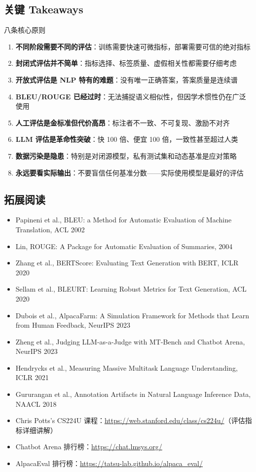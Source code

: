 \documentclass[a4paper]{article}
\begin{document}
\subsection{关键 Takeaways}

\begin{importantbox}{八条核心原则}
\begin{enumerate}
    \item \textbf{不同阶段需要不同的评估}：训练需要快速可微指标，部署需要可信的绝对指标
    \item \textbf{封闭式评估并不简单}：指标选择、标签质量、虚假相关性都需要仔细考虑
    \item \textbf{开放式评估是 NLP 特有的难题}：没有唯一正确答案，答案质量是连续谱
    \item \textbf{BLEU/ROUGE 已经过时}：无法捕捉语义相似性，但因学术惯性仍在广泛使用
    \item \textbf{人工评估是金标准但代价高昂}：标注者不一致、不可复现、激励不对齐
    \item \textbf{LLM 评估是革命性突破}：快 100 倍、便宜 100 倍，一致性甚至超过人类
    \item \textbf{数据污染是隐患}：特别是对闭源模型，私有测试集和动态基准是应对策略
    \item \textbf{永远要看实际输出}：不要盲信任何基准分数——实际使用模型是最好的评估
\end{enumerate}
\end{importantbox}

\subsection{拓展阅读}

\begin{itemize}
    \item Papineni et al., BLEU: a Method for Automatic Evaluation of Machine Translation, ACL 2002
    \item Lin, ROUGE: A Package for Automatic Evaluation of Summaries, 2004
    \item Zhang et al., BERTScore: Evaluating Text Generation with BERT, ICLR 2020
    \item Sellam et al., BLEURT: Learning Robust Metrics for Text Generation, ACL 2020
    \item Dubois et al., AlpacaFarm: A Simulation Framework for Methods that Learn from Human Feedback, NeurIPS 2023
    \item Zheng et al., Judging LLM-as-a-Judge with MT-Bench and Chatbot Arena, NeurIPS 2023
    \item Hendrycks et al., Measuring Massive Multitask Language Understanding, ICLR 2021
    \item Gururangan et al., Annotation Artifacts in Natural Language Inference Data, NAACL 2018
    \item Chris Potts's CS224U 课程：\url{https://web.stanford.edu/class/cs224u/}（评估指标详细讲解）
    \item Chatbot Arena 排行榜：\url{https://chat.lmsys.org/}
    \item AlpacaEval 排行榜：\url{https://tatsu-lab.github.io/alpaca_eval/}
\end{itemize}
\end{document}
